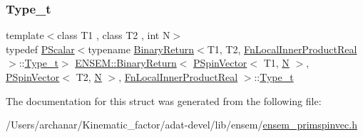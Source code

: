 \subsubsection{\texorpdfstring{Type\_t}{Type\_t}\hspace{0.1cm}{\footnotesize\ttfamily [3/3]}}
{\footnotesize\ttfamily template$<$class T1 , class T2 , int N$>$ \\
typedef \mbox{\hyperlink{classENSEM_1_1PScalar}{P\+Scalar}}$<$typename \mbox{\hyperlink{structENSEM_1_1BinaryReturn}{Binary\+Return}}$<$T1, T2, \mbox{\hyperlink{structENSEM_1_1FnLocalInnerProductReal}{Fn\+Local\+Inner\+Product\+Real}}$>$\+::\mbox{\hyperlink{structENSEM_1_1BinaryReturn_3_01PSpinVector_3_01T1_00_01N_01_4_00_01PSpinVector_3_01T2_00_01N_01af7fecc465148c326d536be8c96c14c3_a28528ebdefaac463e65389dc8cc522a7}{Type\+\_\+t}}$>$ \mbox{\hyperlink{structENSEM_1_1BinaryReturn}{E\+N\+S\+E\+M\+::\+Binary\+Return}}$<$ \mbox{\hyperlink{classENSEM_1_1PSpinVector}{P\+Spin\+Vector}}$<$ T1, \mbox{\hyperlink{adat__devel_2lib_2hadron_2operator__name__util_8cc_a7722c8ecbb62d99aee7ce68b1752f337}{N}} $>$, \mbox{\hyperlink{classENSEM_1_1PSpinVector}{P\+Spin\+Vector}}$<$ T2, \mbox{\hyperlink{adat__devel_2lib_2hadron_2operator__name__util_8cc_a7722c8ecbb62d99aee7ce68b1752f337}{N}} $>$, \mbox{\hyperlink{structENSEM_1_1FnLocalInnerProductReal}{Fn\+Local\+Inner\+Product\+Real}} $>$\+::\mbox{\hyperlink{structENSEM_1_1BinaryReturn_3_01PSpinVector_3_01T1_00_01N_01_4_00_01PSpinVector_3_01T2_00_01N_01af7fecc465148c326d536be8c96c14c3_a28528ebdefaac463e65389dc8cc522a7}{Type\+\_\+t}}}



The documentation for this struct was generated from the following file\+:\begin{DoxyCompactItemize}
\item 
/\+Users/archanar/\+Kinematic\+\_\+factor/adat-\/devel/lib/ensem/\mbox{\hyperlink{adat-devel_2lib_2ensem_2ensem__primspinvec_8h}{ensem\+\_\+primspinvec.\+h}}\end{DoxyCompactItemize}
